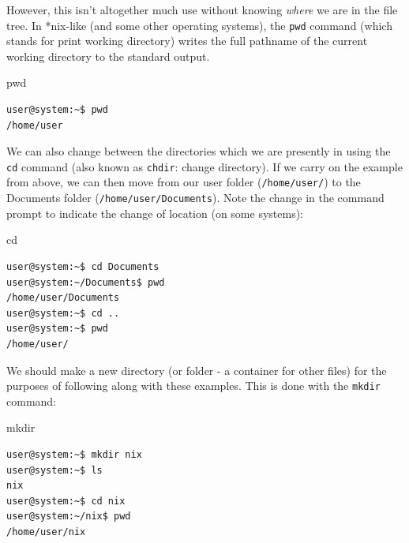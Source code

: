 \documentclass[11pt]{article}
\begin{document}
However, this isn't altogether much use without knowing \emph{where} we are in the file tree. In *nix-like (and some other operating systems), the \texttt{pwd} command (which stands for print working directory) writes the full pathname of the current working directory to the standard output.\\

\begin{listing}[H]
\caption{pwd}\vspace{-0.1in}
\begin{verbatim}
user@system:~$ pwd
/home/user
\end{verbatim}
\end{listing}

We can also change between the directories which we are presently in using the \texttt{cd} command (also known as \texttt{chdir}: change directory). If we carry on the example from above, we can then move from our user folder (\texttt{/home/user/}) to the Documents folder (\texttt{/home/user/Documents}). Note the change in the command prompt to indicate the change of location (on some systems):\\

\begin{listing}[H]
\caption{cd}\vspace{-0.1in}
\begin{verbatim}
user@system:~$ cd Documents
user@system:~/Documents$ pwd
/home/user/Documents
user@system:~$ cd ..
user@system:~$ pwd
/home/user/
\end{verbatim}
\end{listing}

We should make a new directory (or folder - a container for other files) for the purposes of following along with these examples. This is done with the \texttt{mkdir} command:\\

\begin{listing}[H]
\caption{mkdir}\vspace{-0.1in}
\begin{verbatim}
user@system:~$ mkdir nix
user@system:~$ ls
nix
user@system:~$ cd nix
user@system:~/nix$ pwd
/home/user/nix
\end{verbatim}
\end{listing}
\end{document}
